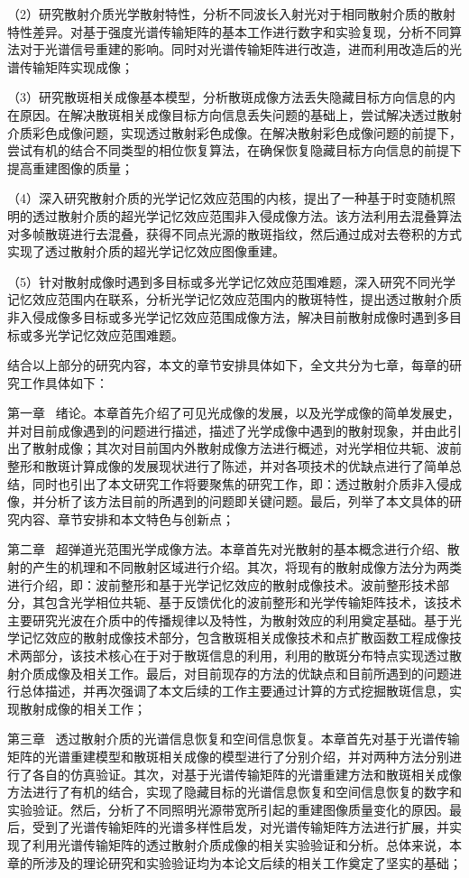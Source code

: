 （2）研究散射介质光学散射特性，分析不同波长入射光对于相同散射介质的散射特性差异。对基于强度光谱传输矩阵的基本工作进行数字和实验复现，分析不同算法对于光谱信号重建的影响。同时对光谱传输矩阵进行改造，进而利用改造后的光谱传输矩阵实现成像；

（3）研究散斑相关成像基本模型，分析散斑成像方法丢失隐藏目标方向信息的内在原因。在解决散斑相关成像目标方向信息丢失问题的基础上，尝试解决透过散射介质彩色成像问题，实现透过散射彩色成像。在解决散射彩色成像问题的前提下，尝试有机的结合不同类型的相位恢复算法，在确保恢复隐藏目标方向信息的前提下提高重建图像的质量；

（4）深入研究散射介质的光学记忆效应范围的内核，提出了一种基于时变随机照明的透过散射介质的超光学记忆效应范围非入侵成像方法。该方法利用去混叠算法对多帧散斑进行去混叠，获得不同点光源的散斑指纹，然后通过成对去卷积的方式实现了透过散射介质的超光学记忆效应图像重建。

（5）针对散射成像时遇到多目标或多光学记忆效应范围难题，深入研究不同光学记忆效应范围内在联系，分析光学记忆效应范围内的散斑特性，提出透过散射介质非入侵成像多目标或多光学记忆效应范围成像方法，解决目前散射成像时遇到多目标或多光学记忆效应范围难题。

结合以上部分的研究内容，本文的章节安排具体如下，全文共分为七章，每章的研究工作具体如下：

第一章 \ 绪论。本章首先介绍了可见光成像的发展，以及光学成像的简单发展史，并对目前成像遇到的问题进行描述，描述了光学成像中遇到的散射现象，并由此引出了散射成像；其次对目前国内外散射成像方法进行概述，对光学相位共轭、波前整形和散斑计算成像的发展现状进行了陈述，并对各项技术的优缺点进行了简单总结，同时也引出了本文研究工作将要聚焦的研究工作，即：透过散射介质非入侵成像，并分析了该方法目前的所遇到的问题即关键问题。最后，列举了本文具体的研究内容、章节安排和本文特色与创新点；

第二章 \ 超弹道光范围光学成像方法。本章首先对光散射的基本概念进行介绍、散射的产生的机理和不同散射区域进行介绍。其次，将现有的散射成像方法分为两类进行介绍，即：波前整形和基于光学记忆效应的散射成像技术。波前整形技术部分，其包含光学相位共轭、基于反馈优化的波前整形和光学传输矩阵技术，该技术主要研究光波在介质中的传播规律以及特性，为散射效应的利用奠定基础。基于光学记忆效应的散射成像技术部分，包含散斑相关成像技术和点扩散函数工程成像技术两部分，该技术核心在于对于散斑信息的利用，利用的散斑分布特点实现透过散射介质成像及相关工作。最后，对目前现存的方法的优缺点和目前所遇到的问题进行总体描述，并再次强调了本文后续的工作主要通过计算的方式挖掘散斑信息，实现散射成像的相关工作；

第三章 \ 透过散射介质的光谱信息恢复和空间信息恢复。本章首先对基于光谱传输矩阵的光谱重建模型和散斑相关成像的模型进行了分别介绍，并对两种方法分别进行了各自的仿真验证。其次，对基于光谱传输矩阵的光谱重建方法和散斑相关成像方法进行了有机的结合，实现了隐藏目标的光谱信息恢复和空间信息恢复的数字和实验验证。然后，分析了不同照明光源带宽所引起的重建图像质量变化的原因。最后，受到了光谱传输矩阵的光谱多样性启发，对光谱传输矩阵方法进行扩展，并实现了利用光谱传输矩阵的透过散射介质成像的相关实验验证和分析。总体来说，本章的所涉及的理论研究和实验验证均为本论文后续的相关工作奠定了坚实的基础；

